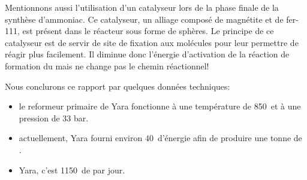 	Mentionnons aussi l'utilisation d'un catalyseur lors de la phase finale de la synthèse d'ammoniac. Ce catalyseur, un alliage composé de magnétite et de fer-111, est présent dans le réacteur sous forme de sphères. Le principe de ce catalyseur est de servir de site de fixation aux molécules pour leur permettre de réagir plus facilement. Il diminue donc l'énergie d'activation de la réaction de formation du  mais ne change pas le chemin réactionnel!
	
	Nous conclurons ce rapport par quelques données techniques:
	\begin{itemize}
	\item le reformeur primaire de Yara fonctionne à une température de 850\celsius \ et à une pression de 33 bar.
	\item actuellement, Yara fourni environ 40\giga\joule \ d'énergie afin de produire une tonne de .
	\item Yara, c'est 1150\tonne \ de  par jour. 
	\end{itemize}
		